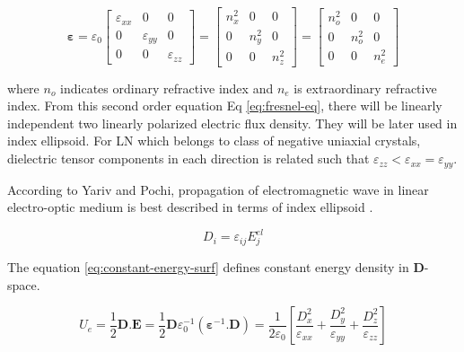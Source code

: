 \documentclass[thesis]{deutez}
\begin{document}
    \begin{equation}
        \bm\varepsilon=\varepsilon_0
        \begin{bmatrix}
            \varepsilon_{xx} & 0 & 0\\
            0 & \varepsilon_{yy} & 0\\
            0 & 0 & \varepsilon_{zz}
        \end{bmatrix}
        =
        \begin{bmatrix}
            n^2_{x} & 0 & 0\\
            0 & n^2_{y} & 0\\
            0 & 0 & n^2_{z} 
        \end{bmatrix}
        =
        \begin{bmatrix}
            n^2_{o} & 0 & 0\\
            0 & n^2_{o} & 0\\
            0 & 0 & n^2_{e} 
        \end{bmatrix}
        \label{eq:dielectric-tensor}
    \end{equation}
    
    where $n_o$ indicates ordinary refractive index and $n_e$ is extraordinary refractive index. From this second order equation Eq \ref{eq:fresnel-eq}, there will be linearly independent two linearly polarized electric flux density. They will be later used in index ellipsoid. For LN which belongs to class of negative uniaxial crystals, dielectric tensor components in each direction is related such that $\varepsilon_{zz} < \varepsilon_{xx}=\varepsilon_{yy}$. 

     
    According to Yariv and Pochi, propagation of electromagnetic wave in linear electro-optic medium is best described in terms of index ellipsoid \cite{2}. 

    \begin{equation}
        D_i = \varepsilon_{ij}E_j^{el}
        \label{eq:flux-den}
    \end{equation}

    The equation \ref{eq:constant-energy-surf} defines constant energy density in $\mathbf{D}$-space. 
    
    \begin{equation}
        U_e = \frac{1}{2}\mathbf{D}.\mathbf{E} = \frac{1}{2} \mathbf{D} \varepsilon_0^{-1}(\bm\varepsilon^{-1}.\mathbf{D}) = \frac{1}{2\varepsilon_0} \left[ \frac{D_x^2}{\varepsilon_{xx}} + \frac{D_y^2}{\varepsilon_{yy}} + \frac{D_z^2}{\varepsilon_{zz}} \right]
        \label{eq:constant-energy-surf} 
    \end{equation}
\end{document}
